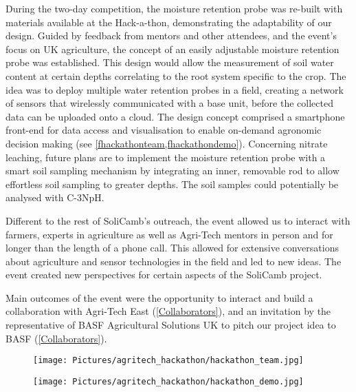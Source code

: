 During the two-day competition, the moisture retention probe was re-built with materials available at the Hack-a-thon, demonstrating the adaptability of our design. Guided by feedback from mentors and other attendees, and the event's focus on UK agriculture, the concept of an easily adjustable moisture retention probe was established. This design would allow the measurement of soil water content at certain depths correlating to the root system specific to the crop. The idea was to deploy multiple water retention probes in a field, creating a network of sensors that wirelessly communicated with a base unit, before the collected data can be uploaded onto a cloud. The design concept comprised a smartphone front-end for data access and visualisation to enable on-demand agronomic decision making (see \cref{fhackathonteam,fhackathondemo}). 
Concerning nitrate leaching, future plans are to implement the moisture retention probe with a smart soil sampling mechanism by integrating an inner, removable rod to allow effortless soil sampling to greater depths. The soil samples could potentially be analysed with C-3NpH. 

Different to the rest of SoliCamb's outreach, the event allowed us to interact with farmers, experts in agriculture as well as Agri-Tech mentors in person and for longer than the length of a phone call. This allowed for extensive conversations about agriculture and sensor technologies in the field and led to new ideas. The event created new perspectives for certain aspects of the SoliCamb project.

Main outcomes of the event were the opportunity to interact and build a collaboration with Agri-Tech East (\cref{Collaborators}), and an invitation by the representative of BASF Agricultural Solutions UK to pitch our project idea to BASF (\cref{Collaborators}).


\begin{figure}
	\centerline{\texttt{[image: Pictures/agritech\_hackathon/hackathon\_team.jpg]}}
	\label{fhackathonteam}
\end{figure}
\begin{figure}
	\centerline{\texttt{[image: Pictures/agritech\_hackathon/hackathon\_demo.jpg]}}
	\label{fhackathondemo}
\end{figure}
        

